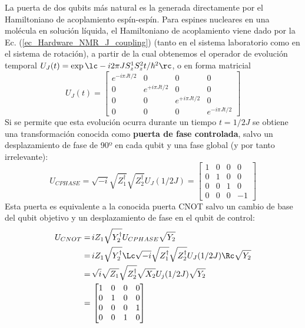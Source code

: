 La puerta de dos qubits más natural es la generada directamente por el Hamiltoniano de acoplamiento espín-espín. Para espines nucleares en una molécula en solución líquida, el Hamiltoniano de acoplamiento viene dado por la Ec. (\ref{ec_Hardware_NMR_J_coupling})  (tanto en el sistema  laboratorio como en el sistema de rotación), a partir de la cual obtenemos el operador de evolución temporal $U_J(t) = \exp \lc - i 2\pi J S_z^1 S_z^2 t /\hbar^2 \rc$, o en forma matricial
	\begin{equation} \label{ec_Hardware_NMR_UJ}
	U_J (t) = 
	\begin{bmatrix}
	e^{-i \pi Jt/2} & 0 & 0 & 0 \\
	0 & e^{+i \pi Jt/2} & 0 & 0 \\
	0 & 0 & e^{+i \pi Jt/2} & 0 \\
	0 & 0 & 0 & e^{-i \pi Jt/2}
	\end{bmatrix}
	\end{equation}
Si se permite que esta evolución ocurra durante un tiempo $t = 1/2J$ se obtiene una transformación conocida como \textbf{puerta de fase controlada}, salvo un desplazamiento de fase de 90º en cada qubit y una fase global (y por tanto irrelevante):
	\begin{equation}
	U_{CPHASE} = \sqrt{-i} \sqrt{Z^\dagger_1} \sqrt{Z^\dagger_2} U_J (1/2J) = 
	\begin{bmatrix}
	1 & 0 & 0  & 0 \\
	0 & 1 & 0  & 0 \\
	0 & 0 & 1 & 0 \\
	0 & 0 & 0  & -1 
	\end{bmatrix}	 
	\end{equation}
Esta puerta es equivalente a la conocida puerta CNOT salvo un cambio de base del qubit objetivo y un desplazamiento de fase en el qubit de control:
	\begin{equation} \label{ec_Hardware_NMR_implementacion_CNOT}
\begin{aligned} 
	U_{CNOT} = & \, i Z_1 \sqrt{Y^\dagger_2} U_{CPHASE} \sqrt{Y_2} \nonumber \\
	= & \, i Z_1 \sqrt{Y^\dagger_2} \Lc \sqrt{-i} \sqrt{Z^\dagger_1} \sqrt{Z^\dagger_2} U_J (1/2J)  \Rc \sqrt{Y_2} \nonumber \\
	= & \, \sqrt{i} \sqrt{Z_1} \sqrt{Z_2^\dagger} \sqrt{X_2} U_j (1/2J) \sqrt{Y_2}  \nonumber \\
	= & \, 
	\begin{bmatrix}
	1 & 0 & 0  & 0 \\
	0 & 1 & 0  & 0 \\
	0 & 0 & 0 & 1 \\
	0 & 0 & 1  & 0 
	\end{bmatrix}
	\end{aligned}
\end{equation}

